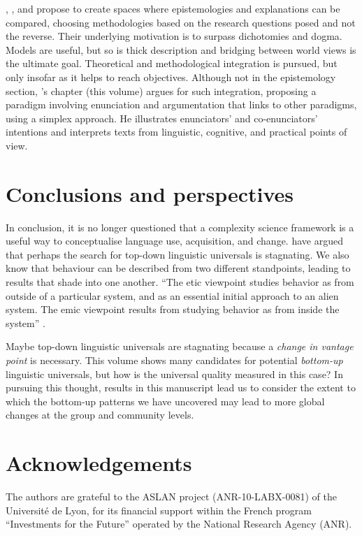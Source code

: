 \documentclass[output=paper]{langscibook}
\begin{document}
, , and  propose to create spaces where epistemologies and explanations can be compared, choosing methodologies based on the research questions posed and not the reverse. Their underlying motivation is to surpass dichotomies and dogma. Models are useful, but so is thick description and bridging between world views is the ultimate goal. Theoretical and methodological integration is pursued, but only insofar as it helps to reach objectives. Although not in the epistemology section, \citeauthor{chapters/06}’s chapter (this volume) argues for such integration, proposing a paradigm involving enunciation and argumentation that links to other paradigms, using a simplex approach. He illustrates enunciators' and co-enunciators’ intentions and interprets texts from linguistic, cognitive, and practical points of view.

\section{Conclusions and perspectives}

In conclusion, it is no longer questioned that a complexity science framework is a useful way to conceptualise language use, acquisition, and change. \citet{BecknerEtAl2009} have argued that perhaps the search for top-down linguistic universals is stagnating. We also know that behaviour can be described from two different standpoints, leading to results that shade into one another. “The etic viewpoint studies behavior as from outside of a particular system, and as an essential initial approach to an alien system. The emic viewpoint results from studying behavior as from inside the system” \citep[37]{Pike1967}.

Maybe top-down linguistic universals are stagnating because a \textit{change in vantage point} is necessary. This volume shows many candidates for potential \textit{bottom-up} linguistic universals, but how is the universal quality measured in this case?  In pursuing this thought, results in this manuscript lead us to consider the extent to which the bottom-up patterns we have uncovered may lead to more global changes at the group and community levels.

\section*{Acknowledgements}
The authors are grateful to the ASLAN project (ANR-10-LABX-0081) of the Université de Lyon, for its financial support within the French program “Investments for the Future” operated by the National Research Agency (ANR).

{\sloppy\printbibliography[heading=subbibliography,notkeyword=this]}
\end{document}
